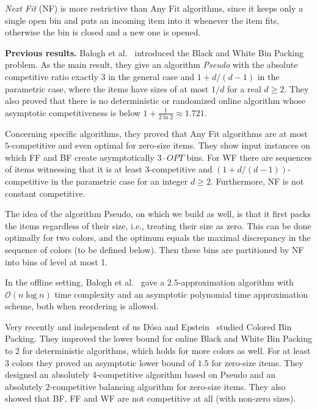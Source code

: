 \documentclass[11pt,a4paper]{article}
\def\O{{\mathcal{O}}}
\def\vari#1{\mathit{#1}}
\begin{document}
\textit{Next Fit} (NF) is more restrictive than Any Fit algorithms,
since it keeps only a single open bin and puts an incoming item into
it whenever the item fits, otherwise the bin is closed and a new one
is opened.

\medskip

\textbf{Previous results.}
Balogh et al.~\cite{balogh13,balogh14} introduced the Black and White
Bin Packing problem.  As the main result, they give an algorithm
{\it Pseudo} with the absolute competitive ratio exactly $3$ in the general
case and $1+d/(d-1)$ in the parametric case, where the items
have sizes of at most $1/d$ for a real $d \geq 2$.  They also proved
that there is no deterministic or randomized online algorithm whose
asymptotic competitiveness is below $1 + \frac{1}{2 \ln 2} \approx
1.721$.

Concerning specific algorithms, they proved that Any Fit algorithms are at most
$5$-competitive and even optimal for zero-size items.  They show input
instances on which FF and BF create asymptotically $3 \cdot
\vari{OPT}$ bins.  For WF there are sequences of items witnessing that it
is at least $3$-competitive and $(1+d/(d-1))$-competitive in
the parametric case for an integer $d \geq 2$.
Furthermore, NF is not constant competitive. 

The idea of the algorithm Pseudo, on which we build as well, is that
it first packs the items regardless of their size, i.e., treating their
size as zero. This can be done optimally for two colors, and the optimum equals the
maximal discrepancy in the sequence of colors (to be defined
below). Then these bins are partitioned by NF into bins of level at
most 1.

In the offline setting, Balogh et al.~\cite{balogh13} gave a $2.5$-approximation
algorithm with $\O(n \log n)$ time complexity and an asymptotic
polynomial time approximation scheme, both when reordering is allowed.

Very recently and independent of us D\'osa and Epstein~\cite{DosEps14}
studied Colored Bin Packing. They improved the lower bound for online
Black and White Bin Packing to $2$ for deterministic algorithms, 
which holds for more colors as well. For at least $3$ colors they
proved an asymptotic lower bound of $1.5$ for zero-size items.
They designed an absolutely 4-competitive algorithm based on Pseudo
and an absolutely $2$-competitive balancing algorithm for
zero-size items. They also showed that BF, FF and WF are not
competitive at all (with non-zero sizes).
\end{document}
